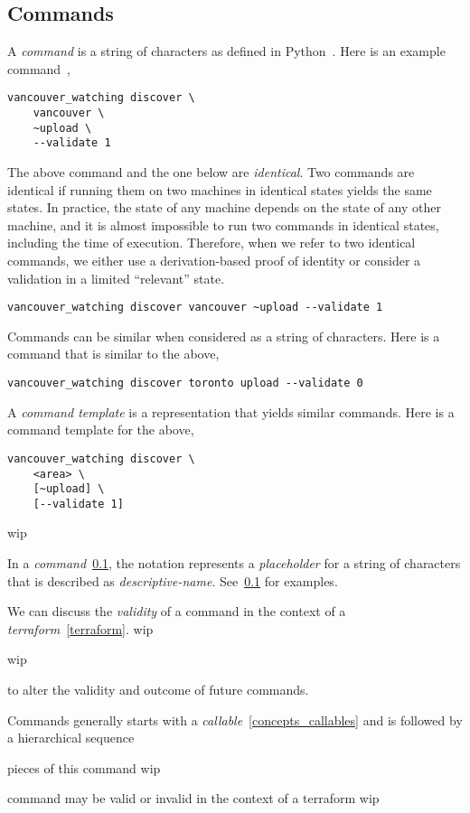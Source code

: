 \subsection{Commands}
\label{commands}

A \emph{command} is a string of characters as defined in Python~\cite{python_string}. Here is an example command~\cite{vanwatch},

\begin{verbatim}
vancouver_watching discover \
    vancouver \
    ~upload \
    --validate 1
\end{verbatim}

The above command and the one below are \emph{identical}. Two commands are identical if running them on two machines in identical states yields the same states. In practice, the state of any machine depends on the state of any other machine, and it is almost impossible to run two commands in identical states, including the time of execution. Therefore, when we refer to two identical commands, we either use a derivation-based proof of identity or consider a validation in a limited ``relevant'' state.

\begin{verbatim}
vancouver_watching discover vancouver ~upload --validate 1
\end{verbatim}

Commands can be similar when considered as a string of characters. Here is a command that is similar to the above,

\begin{verbatim}
vancouver_watching discover toronto upload --validate 0
\end{verbatim}

A \emph{command template} is a representation that yields similar commands. Here is a command template for the above,

\begin{verbatim}
vancouver_watching discover \
    <area> \
    [~upload] \
    [--validate 1]
\end{verbatim}

wip

In a \emph{command}~\ref{commands}, the notation  represents a \emph{placeholder} for a string of characters that is described as \emph{descriptive-name}. See~\ref{commands} for examples.




We can discuss the \emph{validity} of a command in the context of a \emph{terraform}~\ref{terraform}. wip

wip

 to alter the validity and outcome of future commands.

Commands generally starts with a \emph{callable}~\ref{concepts_callables} and is followed by a hierarchical sequence 

pieces of this command wip

command may be valid or invalid in the context of a terraform wip

